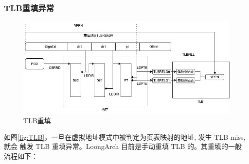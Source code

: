 \subsubsection{TLB重填异常}
\begin{figure}
    \centering
    \label{fig:TLB}
    \includegraphics[width=1\linewidth]{figs/TLB重填.png}
    \caption{TLB重填}
\end{figure}
如图\autoref{fig:TLB}，一旦在虚拟地址模式中被判定为页表映射的地址, 发生 TLB miss, 就会
触发 TLB 重填异常。LoongArch 目前是手动重填 TLB 的。其重填的一般
流程如下：
